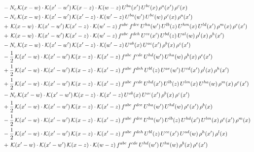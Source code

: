 \documentclass[9pt]{article}
\numberwithin{equation}{section}
\begin{document}
\begin{align}
& -N_{c}\,\mathcal{K}(x-w)\cdot\mathcal{K}(x'-w')\,\mathcal{K}(x-z)\cdot\mathcal{K}(w-z)\,U^{ba}(x')\,U^{bc}(x)\,\rho^{a}(x')\,\rho^{c}(x)\notag\\
& -N_{c}\,\mathcal{K}(x-w)\cdot\mathcal{K}(x'-w')\,\mathcal{K}(x'-z)\cdot\mathcal{K}(w'-z)\,U^{ba}(w')\,U^{bc}(w)\,\rho^{c}(x)\,\rho^{a}(x')\notag\\
& +\,\mathcal{K}(x-w)\cdot\mathcal{K}(x'-w')\,\mathcal{K}(x'-z)\cdot\mathcal{K}(w'-z)\,f^{abc}\,f^{dce}\,U^{ha}(w')\,U^{lb}(z)\,U^{hm}(x)\,U^{ld}(x')\,\rho^{m}(x)\,\rho^{e}(x')\notag\\
& +\,\mathcal{K}(x-w)\cdot\mathcal{K}(x'-w')\,\mathcal{K}(x'-z)\cdot\mathcal{K}(w'-z)\,f^{abc}\,f^{deh}\,U^{ce}(x')\,U^{bd}(z)\,U^{al}(w)\,\rho^{l}(x)\,\rho^{h}(x')\notag\\
& -N_{c}\,\mathcal{K}(x-w)\cdot\mathcal{K}(x'-w')\,\mathcal{K}(x'-z)\cdot\mathcal{K}(w'-z)\,U^{ab}(x)\,U^{ac}(x')\,\rho^{b}(x)\,\rho^{c}(x')\notag\\
& -\frac{1}{2}\,\mathcal{K}(x'-w)\cdot\mathcal{K}(x'-w')\,\mathcal{K}(x-z)\cdot\mathcal{K}(x'-z)\,f^{abc}\,f^{cde}\,U^{hd}(w')\,U^{ha}(w)\,\rho^{b}(x)\,\rho^{e}(x')\notag\\
& +\frac{1}{2}\,\mathcal{K}(x'-w)\cdot\mathcal{K}(x'-w')\,\mathcal{K}(x-z)\cdot\mathcal{K}(x'-z)\,f^{abc}\,f^{deh}\,U^{bl}(z)\,U^{ae}(w')\,U^{cd}(x')\,\rho^{l}(x)\,\rho^{h}(x')\notag\\
& +\frac{1}{2}\,\mathcal{K}(x'-w)\cdot\mathcal{K}(x'-w')\,\mathcal{K}(x-z)\cdot\mathcal{K}(x'-z)\,f^{abc}\,f^{cde}\,U^{hd}(x')\,U^{lb}(z)\,U^{lm}(x)\,U^{ha}(w)\,\rho^{m}(x)\,\rho^{e}(x')\notag\\
& -N_{c}\,\mathcal{K}(x'-w)\cdot\mathcal{K}(x'-w')\,\mathcal{K}(x-z)\cdot\mathcal{K}(x'-z)\,U^{ab}(x)\,U^{ac}(x')\,\rho^{b}(x)\,\rho^{c}(x')\notag\\
& +\frac{1}{2}\,\mathcal{K}(x'-w)\cdot\mathcal{K}(x'-w')\,\mathcal{K}(x-z)\cdot\mathcal{K}(x'-z)\,f^{abc}\,f^{dce}\,U^{ha}(w')\,U^{hd}(w)\,\rho^{e}(x')\,\rho^{b}(x)\notag\\
& -\frac{1}{2}\,\mathcal{K}(x'-w)\cdot\mathcal{K}(x'-w')\,\mathcal{K}(x-z)\cdot\mathcal{K}(x'-z)\,f^{abc}\,f^{dce}\,U^{ha}(w')\,U^{lb}(z)\,U^{hd}(x')\,U^{lm}(x)\,\rho^{e}(x')\,\rho^{m}(x)\notag\\
& -\frac{1}{2}\,\mathcal{K}(x'-w)\cdot\mathcal{K}(x'-w')\,\mathcal{K}(x-z)\cdot\mathcal{K}(x'-z)\,f^{abc}\,f^{deh}\,U^{bl}(z)\,U^{ce}(x')\,U^{ad}(w)\,\rho^{h}(x')\,\rho^{l}(x)\notag\\
& +\,\mathcal{K}(x'-w)\cdot\mathcal{K}(x'-w')\,\mathcal{K}(x-z)\cdot\mathcal{K}(w-z)\,f^{abc}\,f^{cde}\,U^{hd}(w')\,U^{ha}(w)\,\rho^{b}(x)\,\rho^{e}(x')\notag\\

\end{align}
\end{document}
